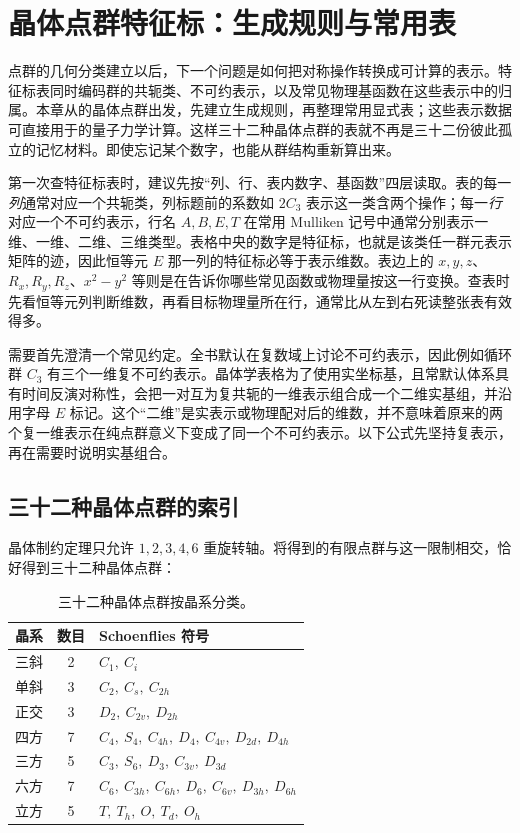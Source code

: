 \chapter{晶体点群特征标：生成规则与常用表}
\label{app:crystal-character-tables}

点群的几何分类建立以后，下一个问题是如何把对称操作转换成可计算的表示。特征标表同时编码群的共轭类、不可约表示，以及常见物理基函数在这些表示中的归属。本章从的晶体点群出发，先建立生成规则，再整理常用显式表；这些表示数据可直接用于的量子力学计算。这样三十二种晶体点群的表就不再是三十二份彼此孤立的记忆材料。即使忘记某个数字，也能从群结构重新算出来。

第一次查特征标表时，建议先按“列、行、表内数字、基函数”四层读取。表的每一\emph{列}通常对应一个共轭类，列标题前的系数如 $2C_3$ 表示这一类含两个操作；每一\emph{行}对应一个不可约表示，行名 $A,B,E,T$ 在常用 Mulliken 记号中通常分别表示一维、一维、二维、三维类型。表格中央的数字是特征标，也就是该类任一群元表示矩阵的迹，因此恒等元 $E$ 那一列的特征标必等于表示维数。表边上的 $x,y,z$、$R_x,R_y,R_z$、$x^2-y^2$ 等则是在告诉你哪些常见函数或物理量按这一行变换。查表时先看恒等元列判断维数，再看目标物理量所在行，通常比从左到右死读整张表有效得多。

需要首先澄清一个常见约定。全书默认在复数域上讨论不可约表示，因此例如循环群 $C_3$ 有三个一维复不可约表示。晶体学表格为了使用实坐标基，且常默认体系具有时间反演对称性，会把一对互为复共轭的一维表示组合成一个二维实基组，并沿用字母 $E$ 标记。这个“二维”是实表示或物理配对后的维数，并不意味着原来的两个复一维表示在纯点群意义下变成了同一个不可约表示。以下公式先坚持复表示，再在需要时说明实基组合。

\section{三十二种晶体点群的索引}

晶体制约定理只允许 $1,2,3,4,6$ 重旋转轴。将得到的有限点群与这一限制相交，恰好得到三十二种晶体点群：

\begin{table}[htbp]
\centering
\caption{三十二种晶体点群按晶系分类。}
\label{tab:32-crystal-point-groups-app}
\begin{tabular}{ccl}
\toprule
晶系 & 数目 & Schoenflies 符号 \\
\midrule
三斜 & 2 & $C_1,\ C_i$ \\
单斜 & 3 & $C_2,\ C_s,\ C_{2h}$ \\
正交 & 3 & $D_2,\ C_{2v},\ D_{2h}$ \\
四方 & 7 & $C_4,\ S_4,\ C_{4h},\ D_4,\ C_{4v},\ D_{2d},\ D_{4h}$ \\
三方 & 5 & $C_3,\ S_6,\ D_3,\ C_{3v},\ D_{3d}$ \\
六方 & 7 & $C_6,\ C_{3h},\ C_{6h},\ D_6,\ C_{6v},\ D_{3h},\ D_{6h}$ \\
立方 & 5 & $T,\ T_h,\ O,\ T_d,\ O_h$ \\
\bottomrule
\end{tabular}
\end{table}

